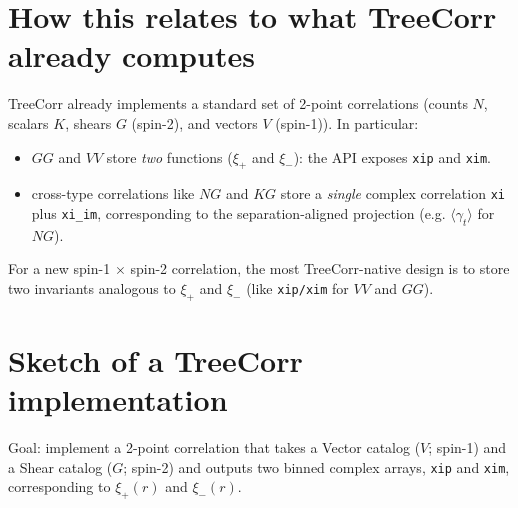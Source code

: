 \documentclass[11pt]{article}
\begin{document}
\section{How this relates to what TreeCorr already computes}
TreeCorr already implements a standard set of 2-point correlations (counts $N$, scalars $K$, shears $G$ (spin-2), and vectors $V$ (spin-1)).
In particular:
\begin{itemize}
  \item $GG$ and $VV$ store \emph{two} functions ($\xi_+$ and $\xi_-$): the API exposes \texttt{xip} and \texttt{xim}.
  \item cross-type correlations like $NG$ and $KG$ store a \emph{single} complex correlation \texttt{xi} plus \texttt{xi\_im}, corresponding to the separation-aligned projection (e.g. $\langle \gamma_t\rangle$ for $NG$).
\end{itemize}

For a new spin-1 $\times$ spin-2 correlation, the most TreeCorr-native design is to store two invariants analogous to $\xi_+$ and $\xi_-$ (like \texttt{xip/xim} for $VV$ and $GG$).

\section{Sketch of a TreeCorr implementation}
Goal: implement a 2-point correlation that takes a Vector catalog ($V$; spin-1) and a Shear catalog ($G$; spin-2) and outputs two binned complex arrays, \texttt{xip} and \texttt{xim}, corresponding to $\xi_+(r)$ and $\xi_-(r)$.
\end{document}
